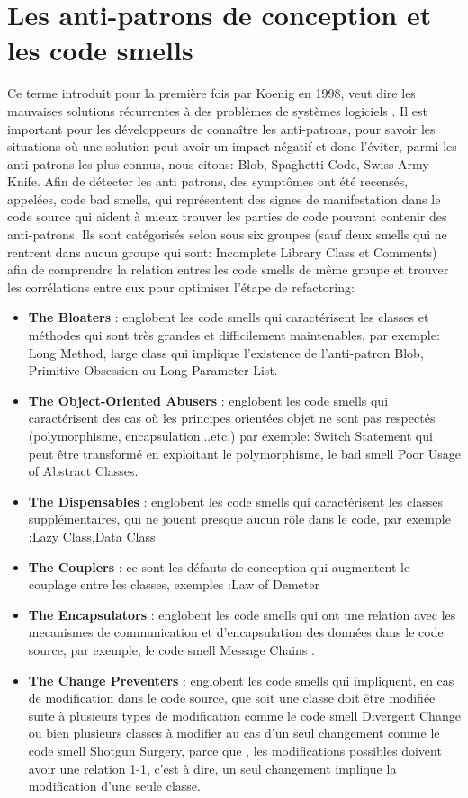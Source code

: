 \section{Les anti-patrons de conception et les code smells}
Ce terme introduit pour la première fois par Koenig en 1998, veut dire les mauvaises solutions récurrentes à des problèmes de systèmes logiciels \cite{brown1998antipatterns}. Il est important pour les développeurs de connaître les anti-patrons, pour savoir les situations où une solution peut avoir un impact négatif et donc l’éviter, parmi les anti-patrons les plus connus, nous citons: Blob, Spaghetti Code, Swiss Army Knife.
\newline
Afin de détecter les anti patrons, des symptômes ont été recensés, appelées, code bad smells, qui représentent des signes de manifestation dans le code source qui aident à mieux trouver les parties de code pouvant contenir des anti-patrons.
\newline
Ils sont catégorisés selon \cite{mantyla2003taxonomy} sous six groupes (sauf deux smells qui ne rentrent dans aucun groupe qui sont: Incomplete Library Class et Comments) afin de comprendre la relation entres les code smells de même groupe et trouver les corrélations entre eux pour optimiser l'étape de refactoring:
\begin{itemize}
    \item \textbf{The Bloaters} : englobent les code smells qui caractérisent les classes et méthodes qui sont très grandes et difficilement maintenables, par exemple: Long Method, large class qui implique l’existence de l’anti-patron Blob, Primitive Obsession ou Long Parameter List.
    \item \textbf{The Object-Oriented Abusers} : englobent les code smells qui caractérisent des cas où les principes orientées objet ne sont pas respectés (polymorphisme, encapsulation...etc.) par exemple: Switch Statement qui peut être transformé en exploitant le polymorphisme, le bad smell Poor Usage of Abstract Classes.
    \item \textbf{The Dispensables} : englobent les code smells qui caractérisent les classes supplémentaires, qui ne jouent presque aucun rôle dans le code, par exemple :Lazy Class,Data Class
    \item \textbf{The Couplers} : ce sont les défauts de conception qui augmentent le couplage entre les classes, exemples :Law of Demeter
    \item \textbf{The Encapsulators} : englobent les code smells qui ont une relation avec les mecanismes de communication et d'encapsulation des données dans le code source, par exemple, le code smell Message Chains .
    \item \textbf{The Change Preventers} : englobent les code smells qui impliquent, en cas de modification dans le code source, que soit une classe doit être modifiée suite à plusieurs types de modification comme le code smell Divergent Change ou bien plusieurs classes à modifier au cas d'un seul changement comme le code smell Shotgun Surgery, parce que , les modifications possibles doivent avoir une relation 1-1, c'est à dire, un seul changement implique la modification d'une seule classe.
\end{itemize}
